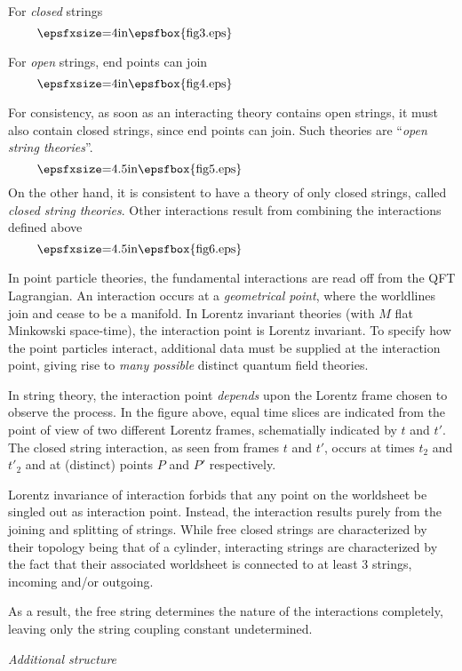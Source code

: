 For {\it closed} strings
$$
\vbox{\epsfxsize=4in\epsfbox{fig3.eps}}
$$

For {\it open} strings, end points can join
$$
\vbox{\epsfxsize=4in\epsfbox{fig4.eps}}
$$


For consistency, as soon as an interacting theory
contains open strings, it must also contain closed
strings, since end points can join.
Such theories are ``{\it open string theories}''.
$$
\vbox{\epsfxsize=4.5in\epsfbox{fig5.eps}}
$$
On the other hand, it is consistent to have a theory
of only closed strings, called  {\it closed string
theories}.
Other interactions result from combining the interactions
defined above
$$
\vbox{\epsfxsize=4.5in\epsfbox{fig6.eps}}
$$

In point particle theories, the fundamental
interactions are read off from the QFT Lagrangian.
An interaction occurs at a {\it geometrical point},
where the worldlines join and cease to be a manifold.
In Lorentz invariant theories (with $M$ flat Minkowski
space-time), the interaction point is Lorentz
invariant.
To specify how the point particles interact,
additional data must be supplied at the interaction
point, giving rise to {\it many possible} distinct
quantum field theories.

\centerline{\null\qquad\epsfxsize=5.0in}

In string theory, the interaction point {\it depends}
upon the Lorentz frame chosen to observe the process.
In the figure above, equal time slices are indicated
from the point of view of two different Lorentz
frames, schematially indicated by $t$ and $t'$.
The closed string interaction, as seen from frames $t$
and $t'$, occurs at times $t_2$ and $t'_2$ and at
(distinct) points $P$ and $P'$ respectively.

Lorentz invariance of interaction forbids that any 
point on the worldsheet be singled out as interaction
point. 
Instead, the interaction results purely from the
joining and splitting of strings.
While free closed
strings are characterized by their topology being
that of a cylinder, interacting strings are
characterized by the fact that their associated
worldsheet is connected to at least 3 strings,
incoming and/or outgoing.

As a result, the free string determines the nature of
the interactions completely, leaving only the string
coupling constant undetermined.

\vfill\eject

\noindent
{\it Additional structure}

